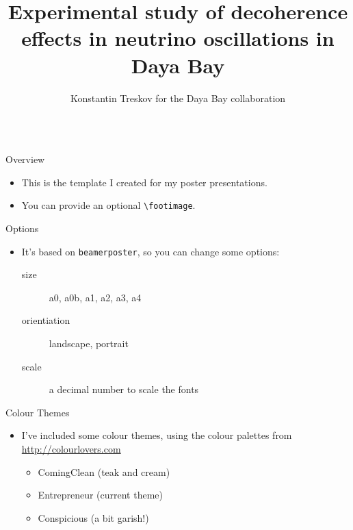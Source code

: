 \documentclass{beamer}
\author[treskov@jinr.ru]{Konstantin Treskov for the Daya Bay collaboration}
\title{Experimental study of decoherence effects in neutrino oscillations in
Daya Bay}
\institute{Joint Institute for Nuclear Research}
\begin{document}
\begin{frame}[fragile]
\begin{columns}[T]

\begin{column}{.33\textwidth}

\begin{block}{Overview}
\begin{itemize}
\item This is the template I created for my poster presentations.
\item You can provide an optional \verb|\footimage|.
\end{itemize}
\end{block}

\begin{block}{Options}
\begin{itemize}
\item It's based on \texttt{beamerposter}, so you can change some options:
  \begin{description}
  \item[size] a0, a0b, a1, a2, a3, a4
  \item[orientiation] landscape, portrait
  \item[scale] a decimal number to scale the fonts
  \end{description}
\end{itemize}
\end{block}

\begin{block}{Colour Themes}
\begin{itemize}
\item I've included some colour themes, using the colour palettes from \url{http://colourlovers.com}
\begin{itemize}
\item ComingClean (teak and cream)
\item Entrepreneur (current theme)
\item Conspicious (a bit garish!)
\end{itemize}
\end{itemize}
\end{block}

\end{column}

\begin{column}{.3\textwidth}


\end{column}
\end{columns}
\end{frame}
\end{document}
